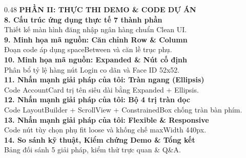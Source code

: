 \documentclass[aspectratio=169, 10pt]{beamer}
\begin{document}
\begin{frame}
\begin{columns}[T]
    \begin{column}{0.48\textwidth}
      {\textcolor{AccentOrange}{\textbf{PHẦN II: THỰC THI DEMO \& CODE DỰ ÁN}}}\\[0.18cm]

      \textbf{8. Cấu trúc ứng dụng thực tế 7 thành phần}\\
      {\footnotesize Thiết kế màn hình đăng nhập ngân hàng chuẩn Clean UI.}\\[0.14cm]

      \textbf{9. Minh họa mã nguồn: Căn chỉnh Row \& Column}\\
      {\footnotesize Đoạn code áp dụng spaceBetween và căn lề trục phụ.}\\[0.14cm]

      \textbf{10. Minh họa mã nguồn: Expanded \& Nút cố định}\\
      {\footnotesize Phân bổ tỷ lệ hàng nút Login co dãn và Face ID 52x52.}\\[0.14cm]

      \textbf{11. Nhấn mạnh giải pháp của tôi: Tràn ngang (Ellipsis)}\\
      {\footnotesize Code AccountCard trị tên siêu dài bằng Expanded + Ellipsis.}\\[0.14cm]

      \textbf{12. Nhấn mạnh giải pháp của tôi: Bộ 4 trị tràn dọc}\\
      {\footnotesize Code LayoutBuilder + ScrollView + ConstrainedBox chống tràn bàn phím.}\\[0.14cm]

      \textbf{13. Nhấn mạnh giải pháp của tôi: Flexible \& Responsive}\\
      {\footnotesize Code nút tùy chọn phụ fit loose và khống chế maxWidth 440px.}\\[0.14cm]

      \textbf{14. So sánh kỹ thuật, Kiểm chứng Demo \& Tổng kết}\\
      {\footnotesize Bảng đối sánh 5 giải pháp, kiểm thử trực quan \& Q\&A.}
    \end{column}
  \end{columns}
\end{frame}
\end{document}
